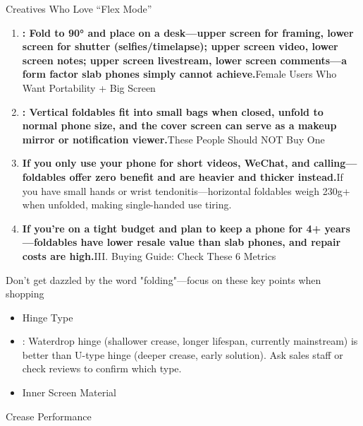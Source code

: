 
Creatives Who Love “Flex Mode”

\begin{enumerate}
  \item \textbf{: Fold to 90° and place on a desk—upper screen for framing, lower screen for shutter (selfies/timelapse); upper screen video, lower screen notes; upper screen livestream, lower screen comments—a form factor slab phones simply cannot achieve.}Female Users Who Want Portability + Big Screen
  \item \textbf{: Vertical foldables fit into small bags when closed, unfold to normal phone size, and the cover screen can serve as a makeup mirror or notification viewer.}These People Should NOT Buy One
  \item \textbf{If you only use your phone for short videos, WeChat, and calling—foldables offer zero benefit and are heavier and thicker instead.}If you have small hands or wrist tendonitis—horizontal foldables weigh 230g+ when unfolded, making single-handed use tiring.
  \item \textbf{If you're on a tight budget and plan to keep a phone for 4+ years—foldables have lower resale value than slab phones, and repair costs are high.}III. Buying Guide: Check These 6 Metrics
\end{enumerate}

\begin{tcbwarn}{Don't get dazzled by the word "folding"—focus on these key points when shopping}
\begin{itemize}
  \item Hinge Type
  \item : Waterdrop hinge (shallower crease, longer lifespan, currently mainstream) is better than U-type hinge (deeper crease, early solution). Ask sales staff or check reviews to confirm which type.
  \item Inner Screen Material
\end{itemize}

\end{tcbwarn}


Crease Performance

